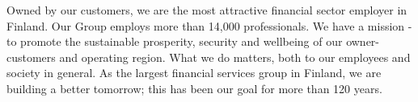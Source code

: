 \documentclass[a4paper,11pt]{article}
\begin{document}
 

Owned by our customers, we are the most attractive financial sector employer in Finland. Our Group employs more than 14,000 professionals. We have a mission - to promote the sustainable prosperity, security and wellbeing of our owner-customers and operating region. What we do matters, both to our employees and society in general. As the largest financial services group in Finland, we are building a better tomorrow; this has been our goal for more than 120 years.
\end{document}
